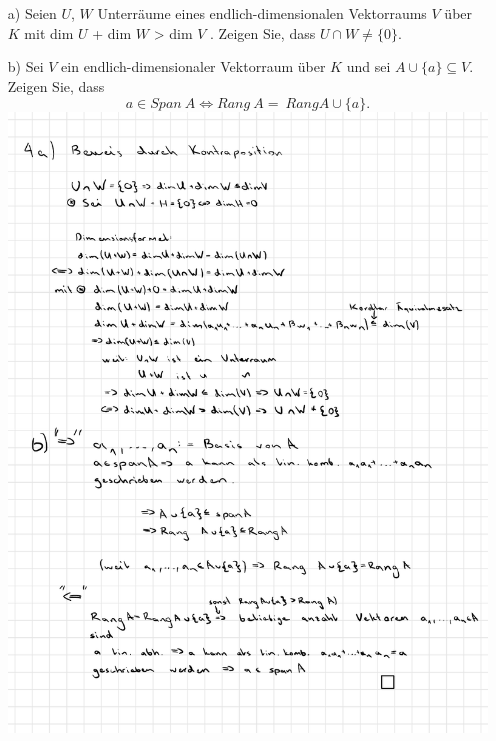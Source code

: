 \documentclass{article}
\begin{document}
    \section{}
    \begin{enumerate}
        \item[a)] Seien $U$, $W$ Unterräume eines endlich-dimensionalen Vektorraums $V$ über $K$ 
        mit dim $U$ + dim $W$ > dim $V$ . Zeigen Sie, dass $U \cap W \neq \{0\}$.

        \item[b)] Sei $V$ ein endlich-dimensionaler Vektorraum über $K$ und sei $A \cup \{a\} \subseteq V$.
        Zeigen Sie, dass \[a \in Span\ A \Leftrightarrow Rang\ A =\ Rang A \cup \{a\}.\]
        \includegraphics{LinAlg06 Aufg4}
    \end{enumerate}
\end{document}
